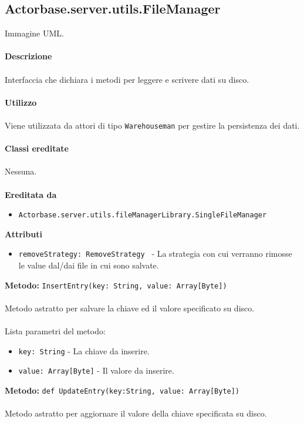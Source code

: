 \documentclass[a4paper]{article}
\begin{document}
		\subsection{Actorbase.server.utils.FileManager}
		Immagine UML.
		\\ \\
		\textbf{Descrizione}
			\\ \\
			Interfaccia che dichiara i metodi per leggere e scrivere dati su disco.
			\\ \\
		\textbf{Utilizzo}
			\\ \\
			Viene utilizzata da attori di tipo \texttt{Warehouseman} per gestire la persistenza dei dati.
			\\ \\
		\textbf{Classi ereditate}
			\\ \\
			Nessuna.
			\\ \\
		\textbf{Ereditata da}
			\begin{itemize}
				\item \texttt{Actorbase.server.utils.fileManagerLibrary.SingleFileManager}
			\end{itemize}
		\textbf{Attributi}
			\begin{itemize}
				\item \texttt{removeStrategy: RemoveStrategy } - La strategia con cui verranno rimosse le value dal/dai file in cui sono salvate.
			\end{itemize}
		\textbf{Metodo:} \texttt{InsertEntry(key: String, value: Array[Byte])}
		\\ \\
		Metodo astratto per salvare la chiave ed il valore specificato su disco.
		\\ \\
		Lista parametri del metodo:
		\begin{itemize}
			\item \texttt{key: String} - La chiave da inserire.
			\item \texttt{value: Array[Byte]} - Il valore da inserire.
		\end{itemize}
		\textbf{Metodo:} \texttt{def UpdateEntry(key:String, value: Array[Byte])}
		\\ \\
		Metodo astratto per aggiornare il valore della chiave specificata su disco.
		\\ \\
\end{document}
